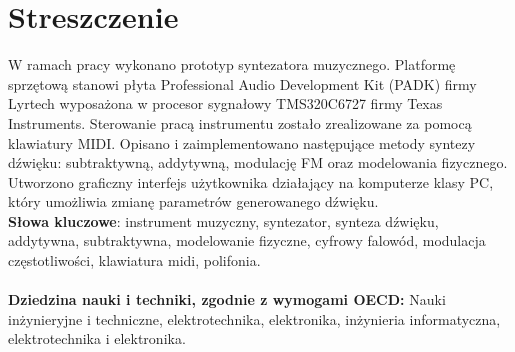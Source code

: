 \chapter*{Streszczenie}
W ramach pracy wykonano prototyp syntezatora muzycznego. Platformę sprzętową stanowi płyta Professional Audio Development Kit (PADK) firmy Lyrtech wyposażona w procesor sygnałowy TMS320C6727 firmy Texas Instruments. Sterowanie pracą instrumentu zostało zrealizowane za pomocą klawiatury MIDI. Opisano i zaimplementowano następujące metody syntezy dźwięku: subtraktywną, addytywną, modulację FM oraz modelowania fizycznego. Utworzono graficzny interfejs użytkownika działający na komputerze klasy PC, który umożliwia zmianę parametrów generowanego dźwięku.
\newline
\\
\textbf{Słowa kluczowe}: instrument muzyczny, syntezator, synteza dźwięku, addytywna, subtraktywna, modelowanie fizyczne, cyfrowy falowód, modulacja częstotliwości, klawiatura midi, polifonia.
\\
\\
\textbf{Dziedzina nauki i techniki, zgodnie z wymogami OECD:} Nauki inżynieryjne i techniczne, elektrotechnika, elektronika, inżynieria informatyczna, elektrotechnika i elektronika.